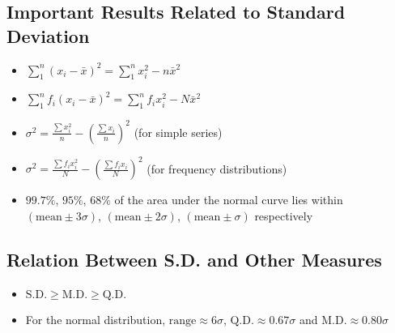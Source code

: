 \subsection*{Important Results Related to Standard Deviation}
\begin{itemize}
    \item $\sum_1^n (x_i - \bar{x})^2 = \sum_1^n x_i^2 - n \bar{x}^2$
    \item $\sum_1^n f_i(x_i - \bar{x})^2 = \sum_1^n f_i x_i^2 - N \bar{x}^2$
    \item $\sigma^2 = \frac{\sum x_i^2}{n} - \left (\frac{\sum x_i}{n} \right )^2$ (for simple series)
    \item $\sigma^2 = \frac{\sum f_i x_i^2}{N} - \left (\frac{\sum f_i x_i}{N} \right )^2$ (for frequency distributions)
    \item $99.7\%$, $95\%$, $68\%$ of the area under the normal curve lies within $(\text{mean} \pm 3\sigma)$, $(\text{mean} \pm 2\sigma)$, $(\text{mean} \pm \sigma)$ respectively
\end{itemize}

\subsection*{Relation Between S.D. and Other Measures}
\begin{itemize}
    \item $\text{S.D.} \geq \text{M.D.} \geq \text{Q.D.}$
    \item For the normal distribution, $\text{range} \approx 6\sigma$, $\text{Q.D.} \approx 0.67 \sigma$ and $\text{M.D.} \approx 0.80 \sigma$
\end{itemize}

